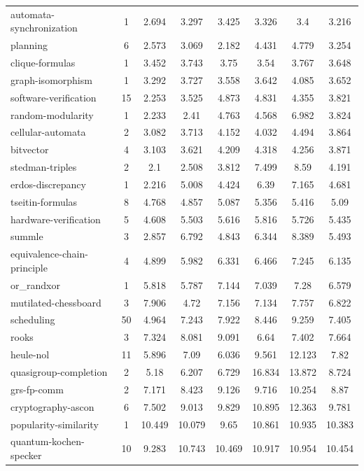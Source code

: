 \documentclass[12pt,a4paper,twoside]{scrartcl}
\numberwithin{equation}{section}
\begin{document}
\begin{longtable}{ lccccccc }
  automata-synchronization	&	1	&	2.694	&	3.297	&	3.425	&	3.326	&	3.4	&	3.216\\
  planning	&	6	&	2.573	&	3.069	&	2.182	&	4.431	&	4.779	&	3.254\\
  clique-formulas	&	1	&	3.452	&	3.743	&	3.75	&	3.54	&	3.767	&	3.648\\
  graph-isomorphism	&	1	&	3.292	&	3.727	&	3.558	&	3.642	&	4.085	&	3.652\\
  software-verification	&	15	&	2.253	&	3.525	&	4.873	&	4.831	&	4.355	&	3.821\\
  random-modularity	&	1	&	2.233	&	2.41	&	4.763	&	4.568	&	6.982	&	3.824\\
  cellular-automata	&	2	&	3.082	&	3.713	&	4.152	&	4.032	&	4.494	&	3.864\\
  bitvector	&	4	&	3.103	&	3.621	&	4.209	&	4.318	&	4.256	&	3.871\\
  stedman-triples	&	2	&	2.1	&	2.508	&	3.812	&	7.499	&	8.59	&	4.191\\
  erdos-discrepancy	&	1	&	2.216	&	5.008	&	4.424	&	6.39	&	7.165	&	4.681\\
  tseitin-formulas	&	8	&	4.768	&	4.857	&	5.087	&	5.356	&	5.416	&	5.09\\
  hardware-verification	&	5	&	4.608	&	5.503	&	5.616	&	5.816	&	5.726	&	5.435\\
  summle	&	3	&	2.857	&	6.792	&	4.843	&	6.344	&	8.389	&	5.493\\
  equivalence-chain-principle	&	4	&	4.899	&	5.982	&	6.331	&	6.466	&	7.245	&	6.135\\
  or\_randxor	&	1	&	5.818	&	5.787	&	7.144	&	7.039	&	7.28	&	6.579\\
  mutilated-chessboard	&	3	&	7.906	&	4.72	&	7.156	&	7.134	&	7.757	&	6.822\\
  scheduling	&	50	&	4.964	&	7.243	&	7.922	&	8.446	&	9.259	&	7.405\\
  rooks	&	3	&	7.324	&	8.081	&	9.091	&	6.64	&	7.402	&	7.664\\
  heule-nol	&	11	&	5.896	&	7.09	&	6.036	&	9.561	&	12.123	&	7.82\\
  quasigroup-completion	&	2	&	5.18	&	6.207	&	6.729	&	16.834	&	13.872	&	8.724\\
  grs-fp-comm	&	2	&	7.171	&	8.423	&	9.126	&	9.716	&	10.254	&	8.87\\
  cryptography-ascon	&	6	&	7.502	&	9.013	&	9.829	&	10.895	&	12.363	&	9.781\\
  popularity-similarity	&	1	&	10.449	&	10.079	&	9.65	&	10.861	&	10.935	&	10.383\\
  quantum-kochen-specker	&	10	&	9.283	&	10.743	&	10.469	&	10.917	&	10.954	&	10.454\\

\end{longtable}
\end{document}
